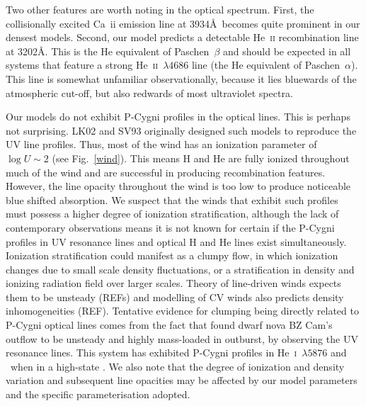 \documentclass[preprint, a4paper, 11pt]{aastex}
\begin{document}
Two other features are worth noting in the optical
spectrum. First, the collisionally excited Ca~{\sc ii} emission line at 3934\AA\ 
becomes quite prominent in our densest models. Second, our model predicts a detectable
He~\textsc{ii} recombination line at 3202\AA. This is the He
equivalent of Paschen~$\beta$ and should be expected in all systems that
feature a strong He~\textsc{ii}~$\lambda4686$ line (the He
equivalent of Paschen~$\alpha$). 
This line is somewhat unfamiliar observationally, because it 
lies bluewards of the atmospheric cut-off, but
also redwards of most ultraviolet spectra. 

Our models do not exhibit P-Cygni profiles in the optical lines.
This is perhaps not surprising. LK02 and SV93 originally designed such models
to reproduce the UV line profiles. Thus, most of the wind
has an ionization parameter of $\log U \sim 2$ (see Fig.~\ref{wind}).
This means H and He are fully ionized throughout 
much of the wind and are successful in producing recombination features.
However, the line opacity throughout the wind is too
low to produce noticeable blue shifted absorption. 
We suspect that the winds that exhibit such profiles must 
possess a higher degree of ionization stratification, although the lack 
of contemporary observations means it is not known for certain if the 
P-Cygni profiles in UV resonance lines and optical H and He lines exist simultaneously.
Ionization stratification could manifest as a clumpy flow, in which ionization changes
due to small scale density fluctuations, or a stratification in density
and ionizing radiation field over larger scales.
Theory of line-driven winds expects them to be unsteady (REFs)
and modelling of CV winds also predicts density inhomogeneities (REF).
Tentative evidence for clumping being directly related to P-Cygni optical lines
comes from the fact that \cite{prinja2000}
found dwarf nova BZ Cam's outflow to be unsteady and highly mass-loaded in outburst,
by observing the UV resonance lines.
This system has exhibited P-Cygni profiles in He~\textsc{i}~$\lambda5876$
and \ha\ when in a high-state \citep{patterson1996,RN98}. 
We also note that the degree of ionization and density variation and 
subsequent line opacities may be affected by our model parameters
and the specific parameterisation adopted.
\end{document}
